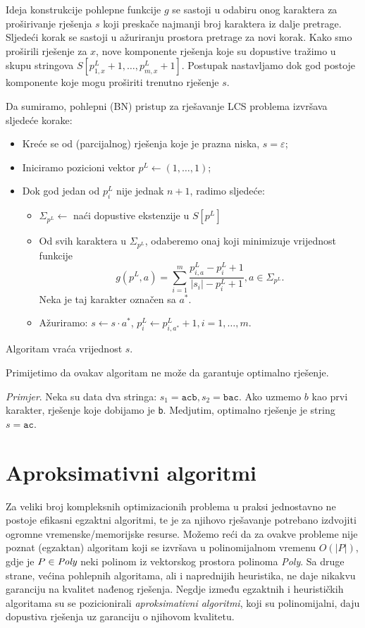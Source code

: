 \documentclass[a4paper, utf8, 11pt, colorlinks]{book}
\begin{document}
 Ideja konstrukcije pohlepne funkcije $g$ se sastoji u odabiru onog karaktera za proširivanje rješenja $s$ koji preskače najmanji broj karaktera iz dalje pretrage. Sljedeći korak se sastoji u ažuriranju prostora pretrage za novi korak. Kako smo proširili rješenje za $x$, nove komponente rješenja koje su dopustive tražimo u skupu stringova $S[p^L_{1,x}+1,\ldots, p^L_{m, x}+1]$. Postupak nastavljamo dok god postoje komponente koje mogu proširiti trenutno rješenje $s$. 


\noindent Da sumiramo, pohlepni (BN) pristup za rješavanje LCS problema izvršava sljedeće korake:
\begin{itemize}
	\item Kreće se od (parcijalnog) rješenja koje je prazna niska, $s=\varepsilon$;
	\item Iniciramo pozicioni vektor $p^L \gets (1,\ldots, 1) $;
	\item Dok god jedan od $p^L_i$ nije jednak $n+1$, radimo sljedeće: 
	\begin{itemize}
   	     \item $\Sigma_{p^L} \gets$ naći dopustive ekstenzije u $S[p^L]$
	      \item Od svih karaktera u $\Sigma_{p^L}$, odaberemo onaj koji minimizuje vrijednost funkcije 
	      $$g( p^L,a) = \sum_{i=1}^m\frac{p^L_{i,a} - p^L_i + 1 }{|s_i| - p^L_i + 1 }, a \in \Sigma_{ p^L }.$$
	      Neka je taj karakter označen sa $a^*$. 
	      \item Ažuriramo: $s \gets  s \cdot a^*$, $p^L_i \gets p^L_{i, a^*} +1, i = 1,\ldots,m.$
    \end{itemize}
\end{itemize}
Algoritam vraća vrijednost $s$. 

Primijetimo da ovakav algoritam ne može da garantuje optimalno rješenje. 

\noindent \emph{Primjer}.  Neka su data dva stringa: $s_1 = \texttt{acb}, s_2 = \texttt{bac}$. Ako uzmemo  $ b$ kao prvi karakter, rješenje koje dobijamo je \texttt{b}. Medjutim, optimalno rješenje je string $s=\texttt{ac}$. 

\section{Aproksimativni algoritmi}
  
   Za veliki broj kompleksnih optimizacionih problema u praksi jednostavno ne postoje efikasni egzaktni algoritmi, te je za  njihovo rješavanje potrebano izdvojiti ogromne vremenske/memorijske resurse. Možemo reći da za  ovakve probleme nije poznat (egzaktan) algoritam koji se izvršava u polinomijalnom vremenu $O(|P|)$, gdje je $P \in \emph{Poly}$ neki polinom iz vektorskog prostora polinoma \emph{Poly}. Sa druge strane, većina pohlepnih algoritama, ali i naprednijih heuristika, ne daje nikakvu garanciju na kvalitet nađenog rješenja. Negdje između egzaktnih i heurističkih algoritama su se pozicionirali \emph{aproksimativni algoritmi}, koji su polinomijalni, daju dopustiva rješenja uz garanciju o njihovom kvalitetu. 
  
\end{document}
